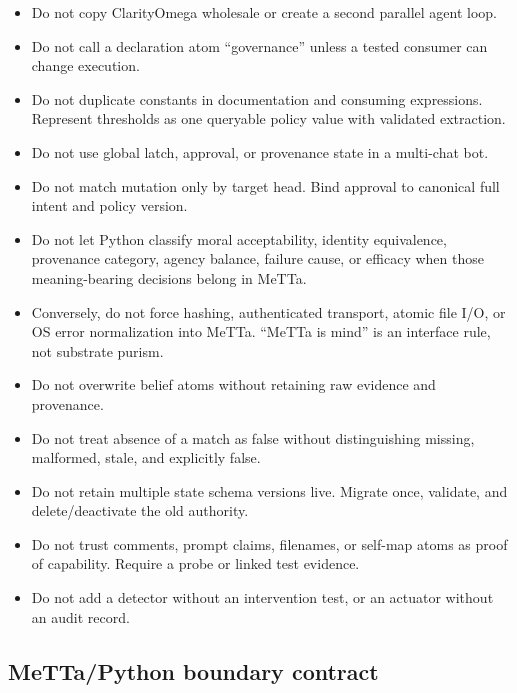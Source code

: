 \documentclass[11pt]{article}
\begin{document}
\begin{itemize}
\item Do not copy ClarityOmega wholesale or create a second parallel agent loop.
\item Do not call a declaration atom ``governance'' unless a tested consumer can
change execution.
\item Do not duplicate constants in documentation and consuming expressions.
Represent thresholds as one queryable policy value with validated extraction.
\item Do not use global latch, approval, or provenance state in a multi-chat bot.
\item Do not match mutation only by target head.  Bind approval to canonical full
intent and policy version.
\item Do not let Python classify moral acceptability, identity equivalence,
provenance category, agency balance, failure cause, or efficacy when those
meaning-bearing decisions belong in MeTTa.
\item Conversely, do not force hashing, authenticated transport, atomic file I/O,
or OS error normalization into MeTTa.  ``MeTTa is mind'' is an interface rule,
not substrate purism.
\item Do not overwrite belief atoms without retaining raw evidence and provenance.
\item Do not treat absence of a match as false without distinguishing missing,
malformed, stale, and explicitly false.
\item Do not retain multiple state schema versions live.  Migrate once, validate,
and delete/deactivate the old authority.
\item Do not trust comments, prompt claims, filenames, or self-map atoms as proof
of capability.  Require a probe or linked test evidence.
\item Do not add a detector without an intervention test, or an actuator without
an audit record.
\end{itemize}

\subsection{MeTTa/Python boundary contract}
\end{document}
